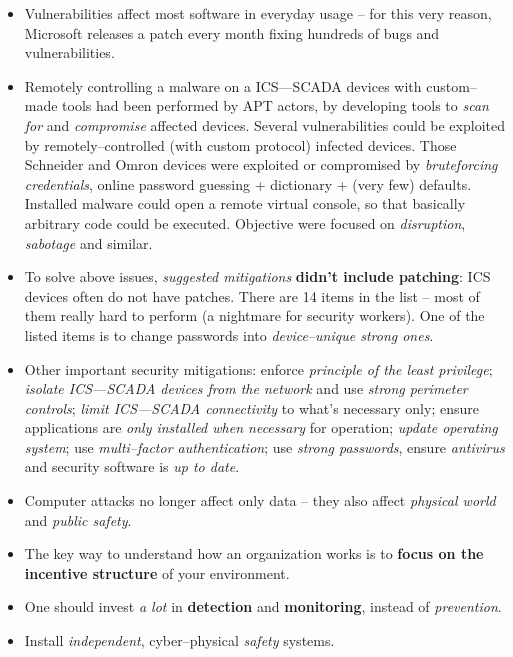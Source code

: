 \documentclass[10pt]{extbook}
\begin{document}
\begin{itemize}
    \item Vulnerabilities affect most software in everyday usage -- for this
        very reason, Microsoft releases a patch every month fixing hundreds of
        bugs and vulnerabilities.
    \item Remotely controlling a malware on a ICS---SCADA devices with
        custom--made tools had been performed by APT actors, by developing
        tools to \emph{scan for} and \emph{compromise} affected devices.
        Several vulnerabilities could be exploited by remotely--controlled
        (with custom protocol) infected devices. Those Schneider and Omron
        devices were exploited or compromised by \emph{bruteforcing
        credentials}, online password guessing + dictionary + (very few)
        defaults. Installed malware could open a remote virtual console, so
        that basically arbitrary code could be executed. Objective were focused
        on \emph{disruption}, \emph{sabotage} and similar.
    \item To solve above issues, \emph{suggested mitigations} \textbf{didn't
        include patching}: ICS devices often do not have patches. There are 14
        items in the list -- most of them really hard to perform (a nightmare
        for security workers). One of the listed items is to change passwords
        into \emph{device--unique strong ones}.
    \item Other important security mitigations: enforce \emph{principle of
        the least privilege}; \emph{isolate ICS---SCADA devices from the
        network} and use \emph{strong perimeter controls}; \emph{limit
        ICS---SCADA connectivity} to what's necessary only; ensure applications
        are \emph{only installed when necessary} for operation; \emph{update
        operating system}; use \emph{multi--factor authentication}; use
        \emph{strong passwords}, ensure \emph{antivirus} and security software
        is \emph{up to date}.
    \item Computer attacks no longer affect only data -- they also affect
        \emph{physical world} and \emph{public safety}.
    \item The key way to understand how an organization works is to
        \textbf{focus on the incentive structure} of your environment.
    \item One should invest \emph{a lot} in \textbf{detection} and
        \textbf{monitoring}, instead of \emph{prevention}.
    \item Install \emph{independent}, cyber--physical \emph{safety} systems.

\end{itemize}
\end{document}

